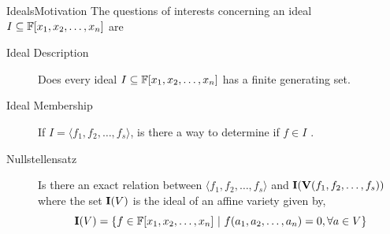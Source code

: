 \documentclass[aspectratio=169, handout, 10pt, hyperref=colorlinks]{beamer}
\begin{document}
\begin{frame}{Ideals}{Motivation}
    The questions of interests concerning an ideal $I\subseteq \mathbb{F}[x_1, x_2, \ldots, x_n]$ are
\begin{description}
    \item[Ideal Description] Does every ideal $I\subseteq\mathbb{F}[x_1, x_2, \ldots, x_n]$ has a finite generating set.
    \item[Ideal Membership] If $I=\langle f_1,f_2,\ldots,f_s\rangle$, is there a way to determine if $f\in I$ .
    \item[Nullstellensatz] Is there an exact relation between $\langle f_1,f_2,\ldots,f_s\rangle$ and $\textbf{I}(\textbf{V}(f_1,f_2,\ldots,f_s))$ where the set $\textbf{I}(V)$ is the ideal of an affine variety given by,
    \begin{equation}
        \textbf{I}(V) =\{f\in\mathbb{F}[x_1, x_2, \ldots, x_n] \ |\ f(a_1, a_2, \ldots, a_n)=0, \forall a\in V\}
    \end{equation}
\end{description}
\end{frame}
\end{document}
